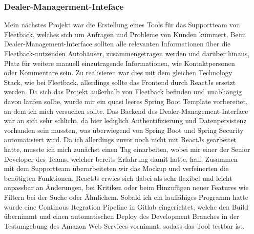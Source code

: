 \documentclass[a4paper, 11pt]{article}
\begin{document}
\subsubsection{Dealer-Managerment-Inteface}
Mein nächstes Projekt war die Erstellung eines Tools für das Supportteam von Fleetback, welches sich um Anfragen und Probleme von Kunden kümmert. Beim Dealer-Management-Interface sollten alle relevanten Informationen über die Fleetback-nutzenden Autohäuser, zusammengetragen werden und darüber hinaus, Platz für weitere manuell einzutragende Informationen, wie Kontaktpersonen oder Kommentare sein. Zu realisieren war dies mit dem gleichen Technology Stack, wie bei Fleetback, allerdings sollte das Frontend durch ReactJs ersetzt werden. Da sich das Projekt außerhalb von Fleetback befinden und unabhängig davon laufen sollte, wurde mir ein quasi leeres Spring Boot Template vorbereitet, an dem ich mich versuchen sollte. Das Backend des Dealer-Management-Interface war an sich sehr schlicht, da hier lediglich Authentifizierung und Datenpersistenz vorhanden sein mussten, was überwiegend von Spring Boot und Spring Security automatisiert wird. Da ich allerdings zuvor noch nicht mit ReactJs gearbeitet hatte, musste ich mich zunächst einen Tag einarbeiten, wobei mir einer der Senior Developer des Teams, welcher bereits Erfahrung damit hatte, half. Zusammen mit dem Supportteam überarbeiteten wir das Mockup und verfeinerten die benötigten Funktionen. ReactJs erwies sich dabei als sehr flexibel und leicht anpassbar an Änderungen, bei Kritiken oder beim Hinzufügen neuer Features wie Filtern bei der Suche oder Ähnlichem. Sobald ich ein lauffähiges Programm hatte wurde eine Continous Itegration Pipeline in Gitlab eingerichtet, welche den Build übernimmt und einen automatischen Deploy des Development Branches in der Testumgebung des Amazon Web Services vornimmt, sodass das Tool testbar ist.
\end{document}
